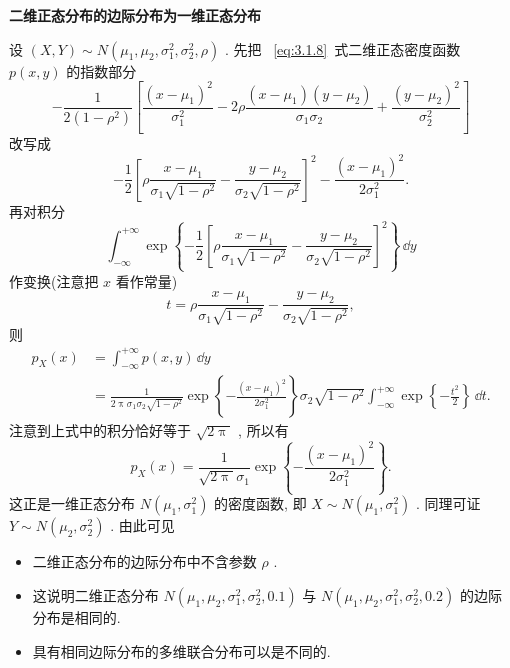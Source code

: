   \begin{example}\label{exam:3.2.5}
  	\textbf{二维正态分布的边际分布为一维正态分布}
  \end{example}
  \begin{solution}
  	设 $(X,Y)\sim N(\mu_1,\mu_2,\sigma_1^2,\sigma_2^2,\rho)$ . 先把 ~\eqref{eq:3.1.8}~式二维正态密度函数 $p(x,y)$ 的指数部分
  	\begin{equation*}
  	-\frac{1}{2(1-\rho^2)}\left[\frac{(x-\mu_1)^2}{\sigma_1^2}-2\rho\frac{(x-\mu_1)(y-\mu_2)}{\sigma_1\sigma_2}+\frac{(y-\mu_2)^2}{\sigma_2^2}\right]
  	\end{equation*}
  	改写成
  	\begin{equation*}
  	-\frac{1}{2}\left[\rho\frac{x-\mu_1}{\sigma_1\sqrt{1-\rho^2}}-\frac{y-\mu_2}{\sigma_2\sqrt{1-\rho^2}}\right]^2-\frac{(x-\mu_1)^2}{2\sigma_1^2}.
  	\end{equation*}
  	再对积分
  	\begin{equation*}
  	\int_{-\infty}^{+\infty}\exp\left\{-\frac{1}{2}\left[\rho\frac{x-\mu_1}{\sigma_1\sqrt{1-\rho^2}}-\frac{y-\mu_2}{\sigma_2\sqrt{1-\rho^2}}\right]^2\right\}\,\dd y
  	\end{equation*}
  	作变换(注意把 $x$ 看作常量)
  	\begin{equation*}
  	t=\rho\frac{x-\mu_1}{\sigma_1\sqrt{1-\rho^2}}-\frac{y-\mu_2}{\sigma_2\sqrt{1-\rho^2}},
  	\end{equation*}
  	则
  	\begin{align*}
  	p_{X}(x) &= \int_{-\infty}^{+\infty}p(x,y)\,\dd y\\
  	&=\frac{1}{2\uppi\sigma_1\sigma_2\sqrt{1-\rho^2}}\exp\left\{-\frac{(x-\mu_1)^2}{2\sigma_1^2}\right\}\sigma_2\sqrt{1-\rho^2}\int_{-\infty}^{+\infty}\exp\left\{-\frac{t^2}{2}\right\}\,\dd t.
  	\end{align*}
  	注意到上式中的积分恰好等于 $\sqrt{2\uppi}$ , 所以有
  	\begin{equation*}
  	p_{X}(x)=\frac{1}{\sqrt{2\uppi}\sigma_1}\exp\left\{-\frac{(x-\mu_1)^2}{2\sigma_1^2}\right\}.
  	\end{equation*}
  	这正是一维正态分布 $N(\mu_1,\sigma_1^2)$ 的密度函数, 即 $X\sim N(\mu_1,\sigma_1^2)$ . 同理可证 $Y\sim N(\mu_2,\sigma_2^2)$ . 由此可见
  	\begin{itemize}
  		\item 二维正态分布的边际分布中不含参数 $\rho$ .
  		\item 这说明二维正态分布 $N(\mu_1,\mu_2,\sigma_1^2,\sigma_2^2,0.1)$ 与 $N(\mu_1,\mu_2,\sigma_1^2,\sigma_2^2,0.2)$ 的边际分布是相同的.
  		\item 具有相同边际分布的多维联合分布可以是不同的.
  	\end{itemize}
  \end{solution}

